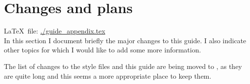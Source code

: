 
\chapter{Changes and plans}%
\label{sec:app:changes}

\LaTeX\ file: \url{./guide_appendix.tex}\\[1ex]
\noindent
In this section I document briefly the major changes to this guide.
I also indicate other topics for which I would like to add some more
information.

The list of changes to the style files and this guide are being moved to ,
as they are quite long and this seems a more appropriate place to keep them.

